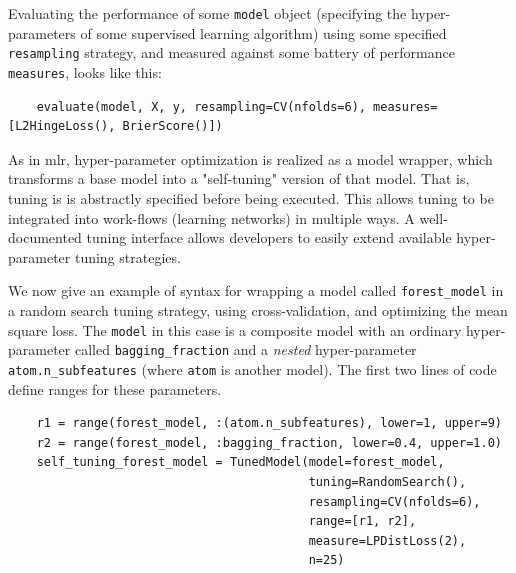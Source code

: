 \documentclass{article}
\begin{document}
Evaluating the performance of some \texttt{model} object (specifying
the hyper-parameters of some supervised learning algorithm) using some
specified \texttt{resampling} strategy, and measured against some
battery of performance \texttt{measures}, looks like this:

\begin{verbatim}
    evaluate(model, X, y, resampling=CV(nfolds=6), measures=[L2HingeLoss(), BrierScore()])
\end{verbatim}


As in mlr, hyper-parameter optimization is realized as a model
wrapper, which transforms a base model into a "self-tuning" version of
that model. That is, tuning is is abstractly specified before being
executed. This allows tuning to be integrated into work-flows
(learning networks) in multiple ways. A well-documented tuning
interface \cite{MLJTuning} allows developers to easily extend
available hyper-parameter tuning strategies.

We now give an example of syntax for wrapping a model called
\texttt{forest\_model} in a random search tuning strategy, using
cross-validation, and optimizing the mean square loss. The
\texttt{model} in this case is a composite model with an ordinary
hyper-parameter called \texttt{bagging\_fraction} and a \textit{nested}
hyper-parameter \texttt{atom.n\_subfeatures} (where \texttt{atom} is
another model). The first two lines of code define ranges for these
parameters.

\begin{verbatim}
    r1 = range(forest_model, :(atom.n_subfeatures), lower=1, upper=9)
    r2 = range(forest_model, :bagging_fraction, lower=0.4, upper=1.0)
    self_tuning_forest_model = TunedModel(model=forest_model,
                                          tuning=RandomSearch(),
                                          resampling=CV(nfolds=6),
                                          range=[r1, r2],
                                          measure=LPDistLoss(2),
                                          n=25)
\end{verbatim}
\end{document}
